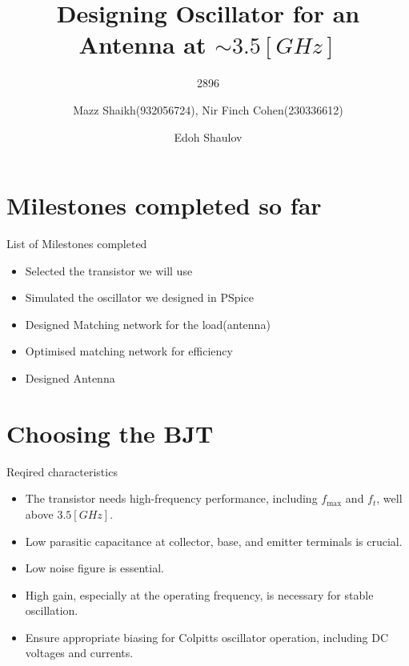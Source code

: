 \documentclass{beamer}
\title{Designing Oscillator for an Antenna at \(\sim3.5[GHz]\)}
\date{}
\subtitle{2896}
\author{Mazz Shaikh(932056724), Nir Finch Cohen(230336612)}
\date{Edoh Shaulov}
\institute{Tel Aviv University}
\begin{document}
\maketitle


\section{Milestones completed so far}

\begin{frame}{List of Milestones completed}

  \begin{itemize}
    \item<1-> Selected the transistor we will use
    \item<2-> Simulated the oscillator we designed in PSpice
    \item<3-> Designed Matching network for the load(antenna)
    \item<4-> Optimised matching network for efficiency
    \item<5-> Designed Antenna
  \end{itemize}
  
  

\end{frame}





\section{Choosing the BJT}
\begin{frame}{Reqired characteristics}
  \begin{itemize}
    \item <1-> The transistor needs high-frequency performance, including \(f_{\text{max}}\) and \(f_t\), well above \(3.5[GHz]\).
    \item <2-> Low parasitic capacitance at collector, base, and emitter terminals is crucial.
    \item <3-> Low noise figure is essential.
    \item <4-> High gain, especially at the operating frequency, is necessary for stable oscillation.
    \item <5-> Ensure appropriate biasing for Colpitts oscillator operation, including DC voltages and currents.
  \end{itemize}
\end{frame}
\end{document}
